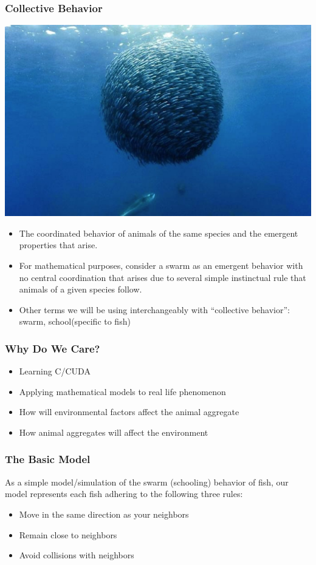\documentclass[xcolor=dvipsnames]{beamer}
\begin{document}
\begin{frame}
	\frametitle{Collective Behavior}
	\begin{center}
	\includegraphics[scale=0.05]{images/fish_schoo.jpg}
	\end{center}
	\begin{itemize}
		\item The coordinated behavior of animals of the same species and the emergent properties that arise.
		\pause
		\item For mathematical purposes, consider a swarm as an emergent behavior with no central coordination that arises due to several simple instinctual rule that animals of a given species follow.
		\pause
		\item Other terms we will be using interchangeably with ``collective behavior'': swarm, school(specific to fish)
	\end{itemize}
\end{frame}

\begin{frame}
	\frametitle{Why Do We Care?}
	\begin{itemize}
			\item Learning C/CUDA
			\item Applying mathematical models to real life phenomenon
			\item How will environmental factors affect the animal aggregate
			\item How animal aggregates will affect the environment 
	\end{itemize}
\end{frame}

\begin{frame}
	\frametitle{The Basic Model}
	As a simple model/simulation of the swarm (schooling) behavior of fish, our model represents each fish adhering to the following three rules:
	\pause
	\begin{itemize}
		\item Move in the same direction as your neighbors
			\pause
		\item Remain close to neighbors
			\pause
		\item Avoid collisions with neighbors
	\end{itemize}
\end{frame}
\end{document}

